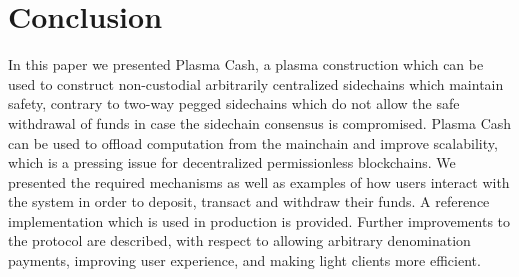 \documentclass[letterpaper, 11pt]{article}
\begin{document}
\section{Conclusion}
In this paper we presented Plasma Cash, a plasma construction which can be used to construct non-custodial arbitrarily centralized sidechains which maintain safety, contrary to two-way pegged sidechains which do not allow the safe withdrawal of funds in case the sidechain consensus is compromised. Plasma Cash can be used to offload computation from the mainchain and improve scalability, which is a pressing issue for decentralized permissionless blockchains. We presented the required mechanisms as well as examples of how users interact with the system in order to deposit, transact and withdraw their funds. A reference implementation which is used in production is provided. Further improvements to the protocol are described, with respect to allowing arbitrary denomination payments, improving user experience, and making light clients more efficient.



\end{document}
